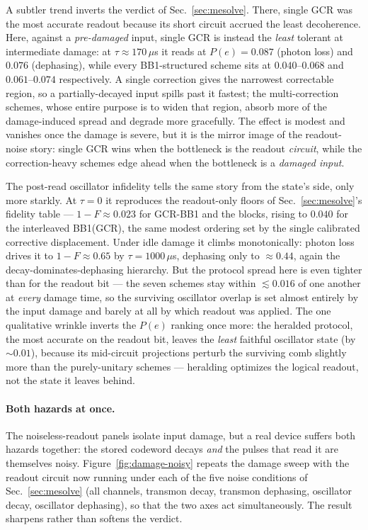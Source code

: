 \documentclass[11pt]{article}
\begin{document}
A subtler trend inverts the verdict of Sec.~\ref{sec:mesolve}. There, single GCR was the most
accurate readout because its short circuit accrued the least decoherence. Here, against a
\emph{pre-damaged} input, single GCR is instead the \emph{least} tolerant at intermediate
damage: at $\tau\approx170\,\mu$s it reads at $P(e)=0.087$ (photon loss) and $0.076$
(dephasing), while every BB1-structured scheme sits at $0.040$--$0.068$ and $0.061$--$0.074$
respectively. A single correction gives the narrowest correctable region, so a partially-decayed
input spills past it fastest; the multi-correction schemes, whose entire purpose is to widen
that region, absorb more of the damage-induced spread and degrade more gracefully. The effect
is modest and vanishes once the damage is severe, but it is the mirror image of the
readout-noise story: single GCR wins when the bottleneck is the readout \emph{circuit}, while
the correction-heavy schemes edge ahead when the bottleneck is a \emph{damaged input}.

The post-read oscillator infidelity tells the same story from the state's side, only more
starkly. At $\tau=0$ it reproduces the readout-only floors of Sec.~\ref{sec:mesolve}'s fidelity
table --- $1-F\approx0.023$ for GCR-BB1 and the blocks, rising to $0.040$ for the interleaved
BB1(GCR), the same modest ordering set by the single calibrated corrective displacement. Under
idle damage it climbs monotonically: photon loss drives it to $1-F\approx0.65$ by
$\tau=1000\,\mu$s, dephasing only to $\approx0.44$, again the decay-dominates-dephasing
hierarchy. But the protocol spread here is even tighter than for the readout bit --- the seven
schemes stay within $\lesssim0.016$ of one another at \emph{every} damage time, so the surviving
oscillator overlap is set almost entirely by the input damage and barely at all by which readout
was applied. The one qualitative wrinkle inverts the $P(e)$ ranking once more: the heralded
protocol, the most accurate on the readout bit, leaves the \emph{least} faithful oscillator
state (by $\sim\!0.01$), because its mid-circuit projections perturb the surviving comb slightly
more than the purely-unitary schemes --- heralding optimizes the logical readout, not the state
it leaves behind.

\paragraph{Both hazards at once.} The noiseless-readout panels isolate input damage, but a real
device suffers both hazards together: the stored codeword decays \emph{and} the pulses that read
it are themselves noisy. Figure~\ref{fig:damage-noisy} repeats the damage sweep with the readout
circuit now running under each of the five noise conditions of Sec.~\ref{sec:mesolve}
(all channels, transmon decay, transmon dephasing, oscillator decay, oscillator dephasing),
so that the two axes act simultaneously. The result sharpens rather than softens the verdict.
\end{document}
